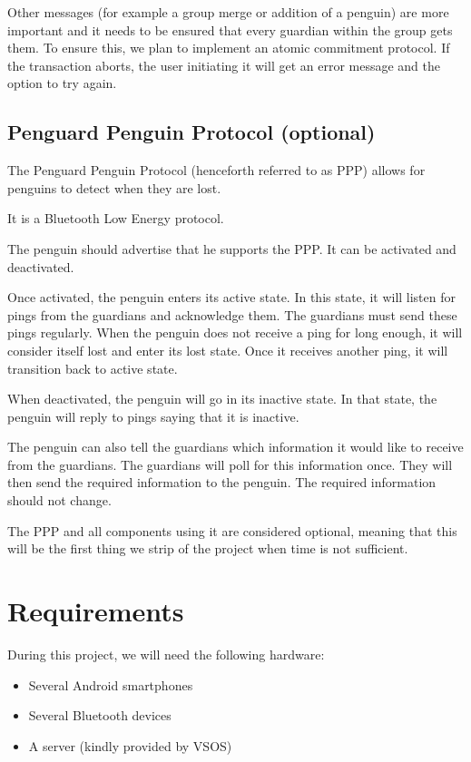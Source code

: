 \documentclass{report}
\begin{document}
Other messages (for example a group merge or addition of a penguin) are more important and it needs to be ensured that every guardian within the group gets them. To ensure this, we plan to implement an atomic commitment protocol. If the transaction aborts, the user initiating it will get an error message and the option to try again.

\subsection{Penguard Penguin Protocol (optional)}

The Penguard Penguin Protocol (henceforth referred to as PPP) allows for penguins to detect when they are lost.

It is a Bluetooth Low Energy protocol.

The penguin should advertise that he supports the PPP. It can be activated and deactivated.

Once activated, the penguin enters its active state. In this state, it will listen for pings from the guardians and acknowledge them. The guardians must send these pings regularly. When the penguin does not receive a ping for long enough, it will consider itself lost and enter its lost state. Once it receives another ping, it will transition back to active state.

When deactivated, the penguin will go in its inactive state. In that state, the penguin will reply to pings saying that it is inactive.

The penguin can also tell the guardians which information it would like to receive from the guardians. The guardians will poll for this information once. They will then send the required information to the penguin. The required information should not change.

The PPP and all components using it are considered optional, meaning that this will be the first thing we strip of the project when time is not sufficient.

\section{Requirements}

During this project, we will need the following hardware:

\begin{itemize}
    \item Several Android smartphones
    \item Several Bluetooth devices
    \item A server (kindly provided by VSOS)
\end{itemize}
\end{document}
